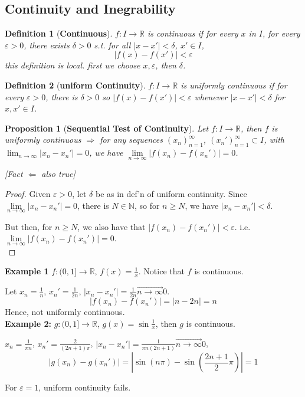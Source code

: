\documentclass[12pt]{article}
\theoremstyle{plain}
\newtheorem{definition}{Definition}[subsection]
\newtheorem{proposition}{Proposition}[subsection]
\newcommand{\abs}[1]{\left| #1 \right|}
\newcommand{\ep}{\varepsilon}
\newcommand{\dlim}{\displaystyle\lim\limits}
\begin{document}
	
	
	\subsection{Continuity and Inegrability}
	\begin{definition}[\textbf{Continuous}]
		$f: I \to \mathbb{R}$ is continuous if for every $x$ in $I$, for every
		$\ep>0$, there exists $\delta >0$ s.t. for all $\abs{x-x'}<\delta$, 
		$x'\in I$, 
		\[ 
			\abs{f(x) -f(x')} < \ep 
		\]
		this definition is local. first we choose $x, \ep$, then $\delta$.\\
	\end{definition}

	\begin{definition}[\textbf{uniform Continuity}]
		$f: I \to \mathbb{R}$ is uniformly continuous if for every $\ep > 0$,
		there is $\delta > 0$ so $\abs{f(x)-f(x')}<\ep$ whenever 
		$\abs{x-x'}<\delta$ for $x, x' \in I$. \\
	\end{definition}

	\begin{proposition}[\textbf{Sequential Test of Continuity}]
		Let $f:I\to \mathbb{R}$, then $f$ is uniformly continuous $\Rightarrow$
		for any sequences $(x_n)_{n=1}^{\infty}$, $(x_n')_{n=1}^{\infty} 
		\subset I$, with $\lim_{n\to \infty} \abs{x_n-x_n'} = 0$, 
		we have $\dlim_{n\to\infty} \abs{f(x_n)-f(x_n')} = 0$. 

		[Fact $\Leftarrow$ also true]
	\end{proposition}
	\begin{proof}
		Given $\ep > 0$, let $\delta$ be as in def'n of uniform continuity.
		Since $\dlim_{n\to\infty} \abs{x_n-x_n'} =0$, there is $N\in\mathbb{N}$,
		so for $n\geq N$, we have $\abs{x_n-x_n'}<\delta$. 

		But then, for $n\geq N$, we also have that $\abs{f(x_n)-f(x_n')}<\ep$.
		i.e. $\dlim_{n\to\infty} \abs{f(x_n)-f(x_n')} = 0$.\\
	\end{proof}

	{\color{Brown}
	\textbf{Example 1}
	$f: (0,1] \to \mathbb{R}$, $f(x) = \frac 1x$. Notice that $f$ is continuous.
	
	Let $x_n=\frac 1n$, $x_n'=\frac1{2n}$, 
	$\abs{x_n-x_n'}=\frac1{2n} \overset{\to}{n\to\infty} 0$.
	\[
		\abs{f(x_n)-f(x_n')} = \abs{n-2n} = n
	\]
	Hence, not uniformly continuous. \\

	\textbf{Example 2:} $g:(0,1]\to\mathbb{R}$, $g(x) = \sin \frac 1x$, then
	$g$ is continuous. 

	$x_n = \frac 1{\pi n}$, $x_n'=\frac 2{(2n+1)\pi}$, 
	$\abs{x_n-x_n'}=\frac1{\pi n (2n+1)} \overset{\to}{n\to\infty} 0$, 
	\[
		\abs{g(x_n)-g(x_n')} = \abs{\sin(n\pi)-\sin(\frac{2n+1}2\pi)} = 1
	\]

	For $\ep = 1$, uniform continuity fails. \\
	}
\end{document}
